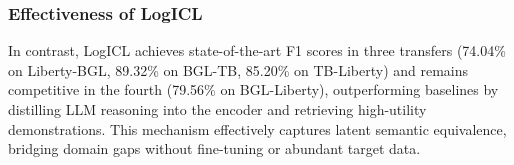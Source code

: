 \documentclass[lettersize,journal]{IEEEtran}
\begin{document}
\subsubsection{Effectiveness of LogICL}
In contrast, LogICL achieves state-of-the-art F1 scores in three transfers (74.04\% on Liberty-BGL, 89.32\% on BGL-TB, 85.20\% on TB-Liberty) and remains competitive in the fourth (79.56\% on BGL-Liberty), outperforming baselines by distilling LLM reasoning into the encoder and retrieving high-utility demonstrations. This mechanism effectively captures latent semantic equivalence, bridging domain gaps without fine-tuning or abundant target data.


\end{document}
